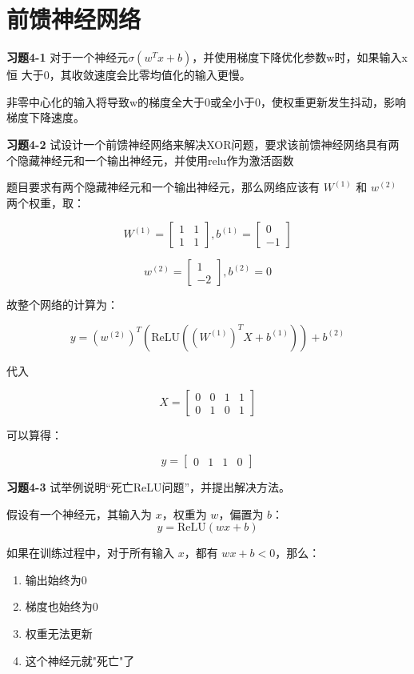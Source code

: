 \section{前馈神经网络}

\noindent\textbf{习题4-1} 对于一个神经元$\sigma(w^Tx+b)$，并使用梯度下降优化参数w时，如果输入x恒
大于0，其收敛速度会比零均值化的输入更慢。

非零中心化的输入将导致w的梯度全大于0或全小于0，使权重更新发生抖动，影响梯度下降速度。

\noindent\textbf{习题4-2} 试设计一个前馈神经网络来解决XOR问题，要求该前馈神经网络具有两个隐藏神经元和一个输出神经元，并使用relu作为激活函数

题目要求有两个隐藏神经元和一个输出神经元，那么网络应该有 $W^{(1)}$ 和 $w^{(2)}$ 两个权重，取：

\[
W^{(1)} = \begin{bmatrix} 1 & 1 \\ 1 & 1 \end{bmatrix}, b^{(1)} = \begin{bmatrix} 0 \\ -1 \end{bmatrix}
\]

\[
w^{(2)} = \begin{bmatrix} 1 \\ -2 \end{bmatrix}, b^{(2)} = 0
\]

故整个网络的计算为：

\[
y = (w^{(2)})^T \left(\text{ReLU}\left((W^{(1)})^T X + b^{(1)}\right)\right) + b^{(2)}
\]

代入

\[
X = \begin{bmatrix} 0 & 0 & 1 & 1 \\ 0 & 1 & 0 & 1 \end{bmatrix}
\]

可以算得：

\[
y = \begin{bmatrix} 0 & 1 & 1 & 0 \end{bmatrix}
\]

\noindent\textbf{习题4-3} 试举例说明“死亡ReLU问题”，并提出解决方法。

假设有一个神经元，其输入为 $x$，权重为 $w$，偏置为 $b$：
\[
y = \text{ReLU}(wx + b)
\]

如果在训练过程中，对于所有输入 $x$，都有 $wx + b < 0$，那么：
\begin{enumerate}
    \item 输出始终为0
    \item 梯度也始终为0
    \item 权重无法更新
    \item 这个神经元就"死亡"了
\end{enumerate}

